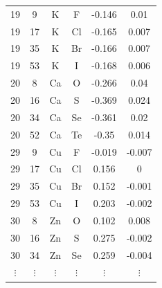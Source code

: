 \documentclass[11pt,oneside,czech,american]{book} %
\theoremstyle{definition} %
\theoremstyle{definition}
\begin{document}
\begin{table}
\begin{minipage}{0.5\textwidth}
\begin{tabular}{cccccc}
			19 &     9 & K   & F   & -0.146 &  0.01  \\
			19 &    17 & K   & Cl  & -0.165 &  0.007 \\
			19 &    35 & K   & Br  & -0.166 &  0.007 \\
			19 &    53 & K   & I   & -0.168 &  0.006 \\
			20 &     8 & Ca  & O   & -0.266 &  0.04  \\
			20 &    16 & Ca  & S   & -0.369 &  0.024 \\
			20 &    34 & Ca  & Se  & -0.361 &  0.02  \\
			20 &    52 & Ca  & Te  & -0.35  &  0.014 \\
			29 &     9 & Cu  & F   & -0.019 & -0.007 \\
			29 &    17 & Cu  & Cl  &  0.156 &  0     \\
			29 &    35 & Cu  & Br  &  0.152 & -0.001 \\
			29 &    53 & Cu  & I   &  0.203 & -0.002 \\
			30 &     8 & Zn  & O   &  0.102 &  0.008 \\
			30 &    16 & Zn  & S   &  0.275 & -0.002 \\
			30 &    34 & Zn  & Se  &  0.259 & -0.004 \\
			$\vdots$ & $\vdots$ & $\vdots$ & $\vdots$ & $\vdots$ & $\vdots$  \\ 
			\bottomrule
		\end{tabular}
		

\end{minipage}
\end{table}
\end{document}
